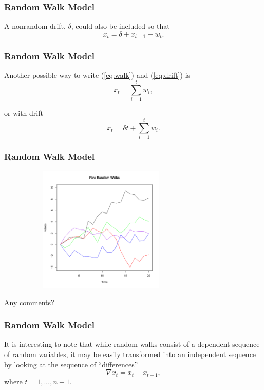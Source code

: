 \documentclass[%
xcolor=pdftex]{beamer}
\begin{document}
\begin{frame}
\frametitle{Random Walk Model}

A nonrandom drift, $\delta$, could also be included so that
 \begin{equation} \label{eq:drift}
 x_t=\delta+x_{t-1}+ w_t.
 \end{equation}

\end{frame}

\begin{frame}
\frametitle{Random Walk Model}

Another possible way to write (\ref{eq:walk}) and (\ref{eq:drift}) is
 \begin{equation}
x_t=\sum_{i=1}^t w_i,
 \end{equation}

or with drift
 \begin{equation}
x_t=\delta t + \sum_{i=1}^t w_i.
 \end{equation}

\end{frame}

\begin{frame}
\frametitle{Random Walk Model}

\includegraphics[width=100mm, height=60mm]{randomwalk.pdf}

Any comments?

\end{frame}

\begin{frame}
\frametitle{Random Walk Model}
It is interesting to note that while random walks consist of a
dependent sequence of random variables, it may be easily
transformed into an independent sequence by looking at the
sequence of ``differences''
 \begin{equation}
\nabla x_t=x_{t}-x_{t-1},
 \end{equation}
where $t=1,...,n-1$.
\end{frame}
\end{document}

